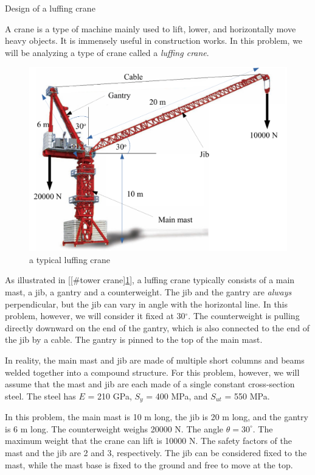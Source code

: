 \documentclass[a4paper,openany,12pt]{book}
\begin{document}
{{\begin{enumerate}
Design of a luffing crane

A crane is a type of machine mainly used to lift, lower, and
horizontally move heavy objects. It is immensely useful in construction
works. In this problem, we will be analyzing a type of crane called a
\emph{luffing crane}.


\begin{figure}[htbp]
\centering
\includegraphics[width=.9\linewidth]{pictures/Simple-load-bearing/tower-crane2.pdf}
\caption{\label{fig:orgdeee370}
a typical luffing crane}
\end{figure}

As illustrated in [[\#tower crane]\ref{fig:orgdeee370}], a luffing crane
typically consists of a main mast, a jib, a gantry and a counterweight.
The jib and the gantry are \emph{always} perpendicular, but the jib can vary
in angle with the horizontal line. In this problem, however, we will
consider it fixed at 30\(^{\circ}\). The counterweight is pulling directly
downward on the end of the gantry, which is also connected to the end of
the jib by a cable. The gantry is pinned to the top of the main mast.

In reality, the main mast and jib are made of multiple short columns and
beams welded together into a compound structure. For this problem,
however, we will assume that the mast and jib are each made of a single
constant cross-section steel. The steel has \(E\) = 210 GPa, \(S_y\) = 400
MPa, and \(S_{ut}\) = 550 MPa.

In this problem, the main mast is 10 m long, the jib is 20 m long, and
the gantry is 6 m long. The counterweight weighs 20000 N. The angle
\(\theta = 30^{\circ}\). The maximum weight that the crane can lift is
10000 N. The safety factors of the mast and the jib are 2 and 3,
respectively. The jib can be considered fixed to the mast, while the
mast base is fixed to the ground and free to move at the top.


\end{enumerate}}}
\end{document}
